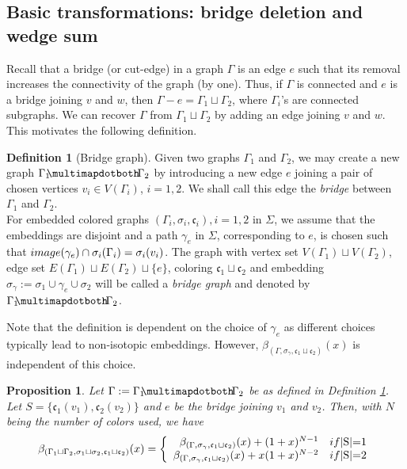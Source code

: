 \documentclass[10pt, reqno]{amsart}
\newcommand{\hf}{\hspace*{0.5cm}}
\theoremstyle{plain}
\newtheorem{prop}[theorem]{Proposition}
\theoremstyle{remark}
\theoremstyle{definition}
\newtheorem{defn}[theorem]{Definition}
\numberwithin{equation}{section}
\begin{document}

\subsection{Basic transformations: bridge deletion and wedge sum}
\label{subsec:delete_edge}

\hf Recall that a bridge (or cut-edge) in a graph $\Gamma$ is an edge $e$ such that its removal increases the connectivity of the graph (by one). Thus, if $\Gamma$ is connected and $e$ is a bridge joining $v$ and $w$, then $\Gamma-e=\Gamma_1\sqcup\Gamma_2$, where $\Gamma_i$'s are connected subgraphs. We can recover $\Gamma$ from $\Gamma_1\sqcup\Gamma_2$ by adding an edge joining $v$ and $w$. This motivates the following definition.
\begin{defn}[Bridge graph]\label{defn:bridge}
Given two graphs $\Gamma_1$ and $\Gamma_2$, we may create a new graph $\Gamma_1\!\!\multimapdotboth\!\Gamma_2$ by introducing a new edge $e$ joining a pair of chosen vertices $v_i\in V(\Gamma_i)$, $i=1,2$. We shall call this edge the \textit{bridge} between $\Gamma_1$ and $\Gamma_2$. \\
\hf For embedded colored graphs $(\Gamma_i,\sigma_i,\mathfrak{c}_i), i=1,2$ in $\Sigma$, we assume that the embeddings are disjoint and a path $\gamma_e$ in $\Sigma$, corresponding to $e$, is chosen such that $\textup{image}(\gamma_e)\cap \sigma_i(\Gamma_i)=\sigma_i(v_i)$. The graph with vertex set $V(\Gamma_1)\sqcup V(\Gamma_2)$, edge set $E(\Gamma_1)\sqcup E(\Gamma_2)\sqcup\{e\}$, coloring $\mathfrak{c}_1\sqcup \mathfrak{c}_2$ and embedding $\sigma_\gamma:=\sigma_1\cup \gamma_e\cup \sigma_2$ will be called a {\it bridge graph} and denoted by $\Gamma_1\!\!\multimapdotboth\!\Gamma_2$.
\end{defn}
Note that the definition is dependent on the choice of $\gamma_e$ as different choices typically lead to non-isotopic embeddings. However, $\beta_{(\Gamma, \sigma_\gamma,\mathfrak{c}_1\sqcup\mathfrak{c}_2)}(x)$ is independent of this choice.
\begin{prop}\label{prop:bridge-del}
    Let $\Gamma:=\Gamma_1\!\!\multimapdotboth\!\Gamma_2$ be as defined in Definition \ref{defn:bridge}. Let $S=\{\mathfrak{c}_1(v_1),\mathfrak{c}_2(v_2)\}$ and $e$ be the bridge joining $v_1$ and $v_2$. Then, with $N$ being the number of colors used, we have 
    \begin{equation}\label{eqn:bridge-del}
    \beta_{(\Gamma_1\sqcup \Gamma_2,\sigma_1\sqcup\sigma_2, \mathfrak{c}_1\sqcup\mathfrak{c}_2)}(x)=\left\{\begin{array}{rl}
    \beta_{(\Gamma, \sigma_\gamma,\mathfrak{c}_1\sqcup\mathfrak{c}_2)}(x) + (1+x)^{N-1} & \textup{if $|S|=1$}\\
    \beta_{(\Gamma, \sigma_\gamma,\mathfrak{c}_1\sqcup\mathfrak{c}_2)}(x) + x(1+x)^{N-2} & \textup{if $|S|=2$}
    \end{array}\right.
    \end{equation}
\end{prop}
\end{document}
